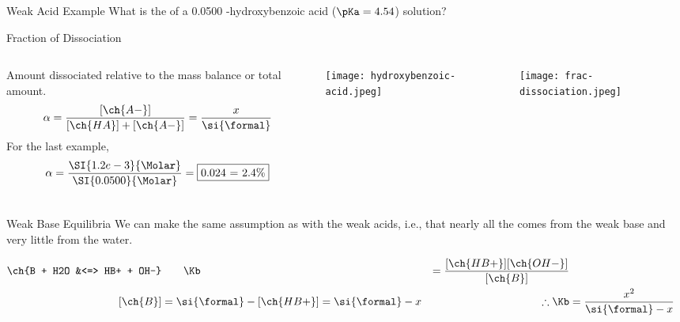 \documentclass[11pt,letterpaper]{article}
\begin{document}

\begin{frame}[t]{Weak Acid Example}
	What is the \pH{} of a \SI{0.0500}{\Molar} \para-hydroxybenzoic acid ($\pKa =
	4.54$) solution?


\end{frame}

\begin{frame}{Fraction of Dissociation}
	\begin{columns}
		Amount dissociated relative to the mass balance or total amount.
		\begin{align*}
			\alpha = \frac{[\ch{A-}]}{[\ch{HA}] + [\ch{A-}]} =
			\frac{x}{\si{\formal}}
		\end{align*}
		For the last example,
		\begin{align*}
			\alpha =
			\frac{\SI{1.2e-3}{\Molar}}{\SI{0.0500}{\Molar}} =
			\fbox{0.024 = 2.4\%}
		\end{align*}
		\begin{center}
			\texttt{[image: hydroxybenzoic-acid.jpeg]}
		\end{center}
		\begin{center}
			\texttt{[image: frac-dissociation.jpeg]}
		\end{center}
	\end{columns}
\end{frame}

\begin{frame}{Weak Base Equilibria}
	We can make the same assumption as with the weak acids, i.e., that
	nearly all the  comes from the weak base and very little from
	the water.

	\begin{align*}
		\ch{B + H2O &<=> HB+ + OH-} &\qquad \Kb &=
		\frac{[\ch{HB+}][\ch{OH-}]}{[\ch{B}]} \\
		[\ch{B}] &= \si{\formal} - [\ch{HB+}] = \si{\formal} - x &\qquad
		\therefore \Kb &= \frac{x^2}{\si{\formal}-x}
	\end{align*}
\end{frame}
\end{document}
